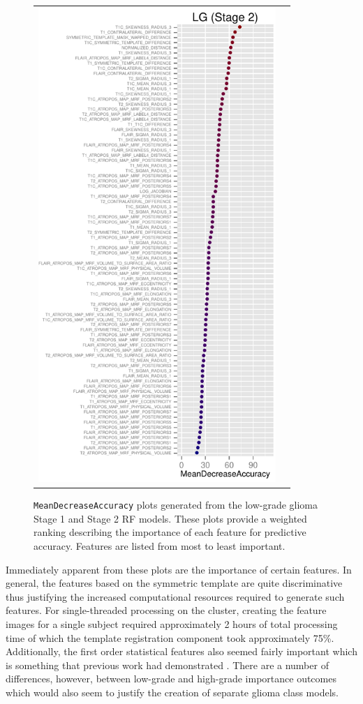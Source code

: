 \documentclass[preprint,authoryear,review,12pt]{elsarticle}
\begin{document}
\begin{figure}
{\begin{tabular}{cc}
  \includegraphics[width=90mm]{Figures/BRATS_LG_MAP_MRF.pdf} \\
  \end{tabular}
  }
  \caption{{\tt MeanDecreaseAccuracy} plots generated from the low-grade glioma
  Stage 1 and Stage 2 RF models.  These plots provide a weighted 
  ranking describing the importance of each feature for predictive accuracy.
  Features are listed from most to least important.
  }
  \label{fig:lgimportance}
\end{figure}

Immediately apparent from these plots are the importance of certain features.
In general, the features based on the symmetric template are quite
discriminative thus justifying the increased computational 
resources required to generate such features.  For single-threaded processing
on the cluster, creating the feature images for a single subject required 
approximately 2 hours of total processing time of which the template registration 
component took approximately 75\%.  Additionally, the first order 
statistical features also seemed fairly important which is something that
previous work had demonstrated \citep[e.g.,][]{bauer2012,zikic2012}.
There are a number of differences, however, between low-grade and high-grade 
importance outcomes which would also seem to justify the creation of separate
glioma class models.
\end{document}
